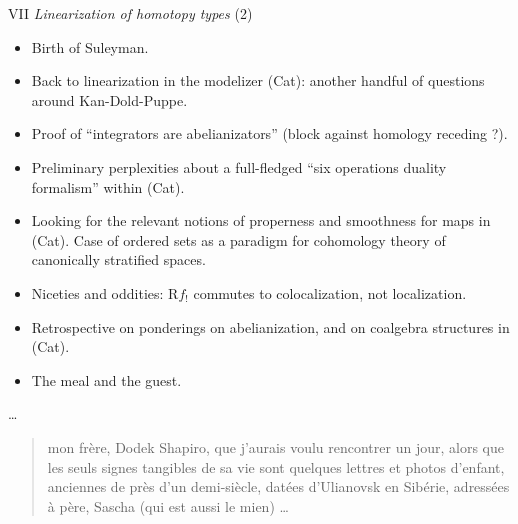 \documentclass[11pt,a4paper]{article}
\begin{document}
VII \emph{Linearization of homotopy types}  (2)
\begin{itemize}
  \item[133.] Birth of Suleyman.
  \item[134.] Back to linearization in the modelizer (Cat): another handful of questions around Kan-Dold-Puppe.
  \item[135.] Proof of ``integrators are abelianizators'' (block against homology receding ?).
  \item[136.] Preliminary perplexities about a full-fledged ``six operations duality formalism'' within (Cat).
  \item[137.] Looking for the relevant notions of properness and smoothness for maps in (Cat). Case of ordered sets as a paradigm for cohomology theory of \struck{\ill{}} canonically stratified spaces.
  \item[138.] Niceties and oddities: $\mathrm{R}f_{!}$ commutes to colocalization, not localization.
  \item[139.] Retrospective on ponderings on abelianization, and on coalgebra structures in (Cat).
  \item[140.] The meal and the guest.
\end{itemize}
… 

\begin{quote}

   mon frère, Dodek Shapiro, que j'aurais voulu rencontrer un jour, alors que les seuls signes tangibles  de sa vie sont quelques lettres et photos d'enfant, anciennes de près d'un demi-siècle, \struck{\ill{}} datées d'Ulianovsk en Sibérie, \struck{\ill{}} adressées à    père, Sascha \struck{\ill{}} (qui est aussi le mien) …
\end{quote}

\end{document}
